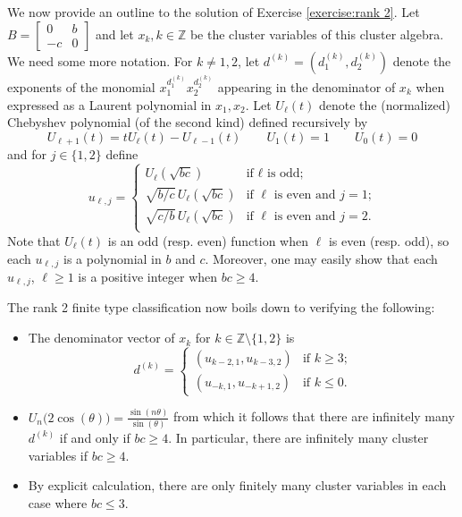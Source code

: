\documentclass{amsart}
\theoremstyle{definition}
\theoremstyle{remark}
\numberwithin{equation}{section}
\newcommand{\ZZ}{{\mathbb{Z}}}
\begin{document}
		We now provide an outline to the solution of Exercise \ref{exercise:rank 2}.  Let $B=\left[\begin{array}{cc} 0 & b\\ -c & 0\end{array}\right]$ and let $x_k, k \in \mathbb{Z}$ be the cluster variables of this cluster algebra.  We need some more notation.  For $k \neq 1,2$, let $d^{(k)}=(d_1^{(k)},d_2^{(k)})$ denote the exponents of the monomial $x_1^{d^{(k)}_1}x_2^{d^{(k)}_2}$ appearing in the denominator of $x_k$ when expressed as a Laurent polynomial in $x_1, x_2$.  Let $U_\ell(t)$ denote the (normalized) Chebyshev polynomial (of the second kind) defined recursively by 
    \[U_{\ell+1}(t)=tU_\ell(t)-U_{\ell-1}(t)\qquad U_1(t)=1\qquad U_0(t)=0\]
    and for $j\in\{1,2\}$ define 
    \[u_{\ell,j}=\begin{cases}U_\ell(\sqrt{bc}) & \text{if $\ell$ is odd;}\\\sqrt{b/c}\,U_\ell(\sqrt{bc}) & \text{if $\ell$ is even and $j=1$;}\\\sqrt{c/b}\,U_\ell(\sqrt{bc}) & \text{if $\ell$ is even and $j=2$.}\\\end{cases}\]
    Note that $U_\ell(t)$ is an odd (resp. even) function when $\ell$ is even (resp. odd), so each $u_{\ell,j}$ is a polynomial in $b$ and $c$.  Moreover, one may easily show that each $u_{\ell,j}$, $\ell\ge1$ is a positive integer when $bc\ge4$.  
	
		The rank 2 finite type classification now boils down to verifying the following:
		\begin{itemize}
		\item The denominator vector of $x_k$ for $k\in\ZZ\setminus\{1,2\}$ is
    \begin{equation}\label{eq:rank 2 denominators}
      d^{(k)}=\begin{cases}(u_{k-2,1},u_{k-3,2}) & \text{if $k\ge3$;}\\(u_{-k,1},u_{-k+1,2}) & \text{if $k\le0$.}\end{cases}
    \end{equation}
    \item $U_n\big(2\cos(\theta)\big)=\frac{\sin(n\theta)}{\sin(\theta)}$ from which it follows that there are infinitely many $d^{(k)}$ if and only if $bc\ge4$.  In particular, there are infinitely many cluster variables if $bc \geq 4$.
		\item By explicit calculation, there are only finitely many cluster variables in each case where $bc \leq 3$.
    \end{itemize}
 
\end{document}
